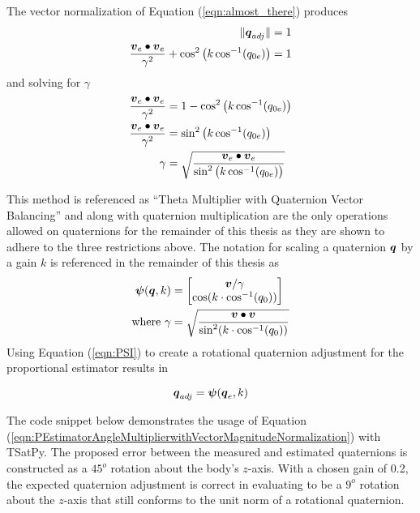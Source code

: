 The vector normalization of Equation (\ref{eqn:almost_there}) produces
\begin{subequations}
  \begin{align}
    \| \boldsymbol{q}_{adj} \| &= 1 \\
    \frac{\boldsymbol{v}_e \bullet \boldsymbol{v}_e}{\gamma^2} + \cos^2 \big( k \cos^{-1} (q_{0e}) \big) &= 1
  \end{align}
\end{subequations}
and solving for $\gamma$
\begin{subequations}
  \begin{align}
    \frac{\boldsymbol{v}_e \bullet \boldsymbol{v}_e}{\gamma^2}  &= 1 - \cos^2 \big( k \cos^{-1} (q_{0e}) \big)\\
    \frac{\boldsymbol{v}_e \bullet \boldsymbol{v}_e}{\gamma^2}  &= \sin^2 \big( k \cos^{-1} (q_{0e}) \big)\\
    \gamma &= \sqrt{\frac{\boldsymbol{v}_e \bullet \boldsymbol{v}_e}{\sin^2 \big( k \cos^{-1} (q_{0e}) \big)}}
  \end{align}
\end{subequations}

This method is referenced as ``Theta Multiplier with Quaternion Vector Balancing'' and along with quaternion multiplication are the only operations allowed on quaternions for the remainder of this thesis as they are shown to adhere to the three restrictions above.  The notation for scaling a quaternion $\boldsymbol{q}$ by a gain $k$ is referenced in the remainder of this thesis as
\begin{equation}
  \begin{aligned}
    \boldsymbol{\psi}(\boldsymbol{q}, k) &= \begin{bmatrix} \boldsymbol{v} / \gamma \\ \cos ( k \cdot \cos^{-1} (q_0))  \end{bmatrix} \\
    \text{where } \gamma &= \sqrt{\frac{\boldsymbol{v} \bullet \boldsymbol{v}}{\sin^2 ( k \cdot \cos^{-1} (q_0))}} \\
  \end{aligned}
  \label{eqn:PSI}
\end{equation}
Using Equation (\ref{eqn:PSI}) to create a rotational quaternion adjustment for the proportional estimator results in

\begin{equation}
  \boldsymbol{q}_{adj} = \boldsymbol{\psi}(\boldsymbol{q}_e, k)
  \label{eqn:PEstimatorAngleMultiplierwithVectorMagnitudeNormalization}
\end{equation}

The code snippet below demonstrates the usage of Equation (\ref{eqn:PEstimatorAngleMultiplierwithVectorMagnitudeNormalization}) with TSatPy.  The proposed error between the measured and estimated quaternions is constructed as a $45^o$ rotation about the body's $z$-axis.  With a chosen gain of 0.2, the expected quaternion adjustment is correct in evaluating to be a $9^o$ rotation about the $z$-axis that still conforms to the unit norm of a rotational quaternion.


